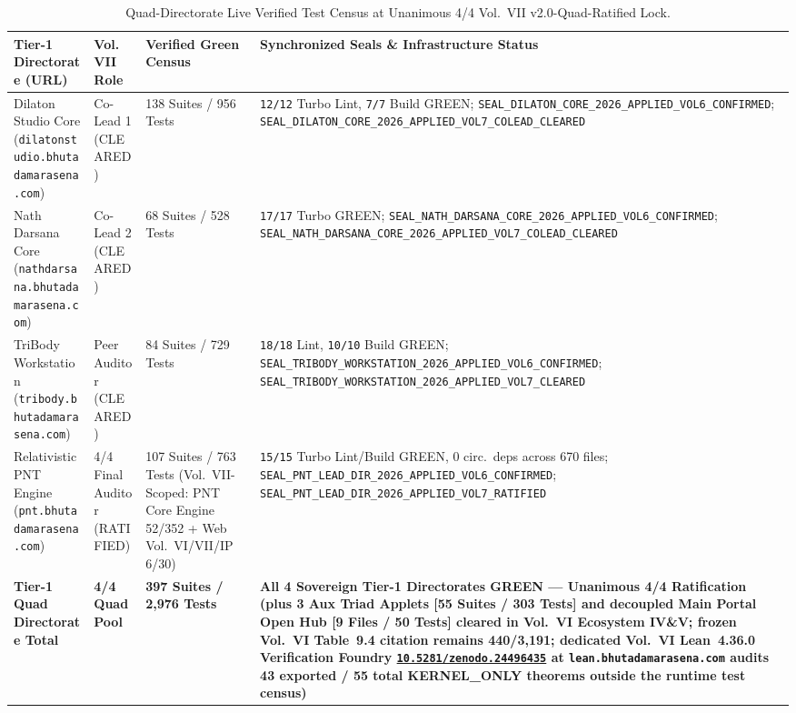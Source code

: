 \documentclass[11pt,a4paper,reqno]{article}
\def\texttt#1{#1}%
\theoremstyle{plain}
\theoremstyle{definition}
\theoremstyle{remark}
\numberwithin{equation}{section}
\numberwithin{table}{section}
\providecommand{\zenodo}[1]{\href{https://doi.org/10.5281/zenodo.#1}{\nolinkurl{10.5281/zenodo.#1}}}
\begin{document}
\begin{table}[H]
\centering
\scriptsize
\caption[Quad-Directorate Post-Vol.~VI Verified Census]{Quad-Directorate Live Verified Test Census at Unanimous 4/4 Vol.~VII \texttt{v2.0-\allowbreak Quad-\allowbreak Ratified} Lock.}
\label{tab:census_vol7}
\setlength{\tabcolsep}{4pt}
\begin{tabularx}{\textwidth}{@{} P{4.35cm} C{2.10cm} C{2.85cm} Y @{}}
\toprule
\textbf{Tier-1 Directorate (URL)} & \textbf{Vol.~VII Role} & \textbf{Verified Green Census} & \textbf{Synchronized Seals \& Infrastructure Status} \\
\midrule
Dilaton Studio Core (\nolinkurl{dilatonstudio.bhutadamarasena.com}) & Co-Lead 1 (CLEARED) & 138 Suites / 956 Tests & \nolinkurl{12/12} Turbo Lint, \nolinkurl{7/7} Build GREEN; \nolinkurl{SEAL_DILATON_CORE_2026_APPLIED_VOL6_CONFIRMED}; \nolinkurl{SEAL_DILATON_CORE_2026_APPLIED_VOL7_COLEAD_CLEARED} \\
Nath Darsana Core (\nolinkurl{nathdarsana.bhutadamarasena.com}) & Co-Lead 2 (CLEARED) & 68 Suites / 528 Tests & \nolinkurl{17/17} Turbo GREEN; \nolinkurl{SEAL_NATH_DARSANA_CORE_2026_APPLIED_VOL6_CONFIRMED}; \nolinkurl{SEAL_NATH_DARSANA_CORE_2026_APPLIED_VOL7_COLEAD_CLEARED} \\
TriBody Workstation (\nolinkurl{tribody.bhutadamarasena.com}) & Peer Auditor (CLEARED) & 84 Suites / 729 Tests & \nolinkurl{18/18} Lint, \nolinkurl{10/10} Build GREEN; \nolinkurl{SEAL_TRIBODY_WORKSTATION_2026_APPLIED_VOL6_CONFIRMED}; \nolinkurl{SEAL_TRIBODY_WORKSTATION_2026_APPLIED_VOL7_CLEARED} \\
Relativistic PNT Engine (\nolinkurl{pnt.bhutadamarasena.com}) & 4/4 Final Auditor (RATIFIED) & 107 Suites / 763 Tests (Vol.~VII-Scoped: PNT Core Engine 52/352 + Web Vol.~VI/VII/IP 6/30) & \nolinkurl{15/15} Turbo Lint/Build GREEN, $0$ circ.\ deps across 670 files; \nolinkurl{SEAL_PNT_LEAD_DIR_2026_APPLIED_VOL6_CONFIRMED}; \nolinkurl{SEAL_PNT_LEAD_DIR_2026_APPLIED_VOL7_RATIFIED} \\
\midrule
\textbf{Tier-1 Quad Directorate Total} & \textbf{4/4 Quad Pool} & \textbf{397 Suites / 2,976 Tests} & \textbf{All 4 Sovereign Tier-1 Directorates GREEN --- Unanimous 4/4 Ratification (plus 3 Aux Triad Applets [55 Suites / 303 Tests] and decoupled Main Portal Open Hub [9 Files / 50 Tests] cleared in Vol.~VI Ecosystem IV\&V; frozen Vol.~VI Table~9.4 citation remains 440/3,191; dedicated Vol.~VI Lean~4.36.0 Verification Foundry \zenodo{24496435} at \nolinkurl{lean.bhutadamarasena.com} audits 43 exported / 55 total \texttt{KERNEL\_ONLY} theorems outside the runtime test census)} \\
\bottomrule
\end{tabularx}
\end{table}
\end{document}
